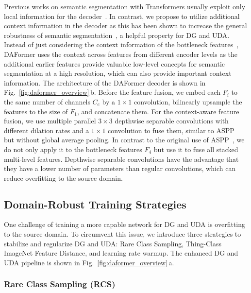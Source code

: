 \documentclass[journal,compsoc]{IEEEtran}
\begin{document}
Previous works on semantic segmentation with Transformers usually exploit only local information for the decoder~\cite{xie2021segformer, zheng2021rethinking}.
In contrast, we propose to utilize additional context information in the decoder
as this has been shown to increase the general robustness of semantic segmentation~\cite{kamann2021benchmarking}, a helpful property for DG and UDA. Instead of just considering the context information of the bottleneck features~\cite{chen2017deeplab, chen2018encoder}, DAFormer uses the context across features from different encoder levels as the additional earlier features provide valuable low-level concepts for semantic segmentation at a high resolution, which can also provide important context information.
The architecture of the DAFormer decoder is shown in Fig.~\ref{fig:daformer_overview}\,b. Before the feature fusion, we embed each $F_i$ to the same number of channels $C_{e}$ by a $1{\times}1$ convolution, bilinearly upsample the features to the size of $F_1$, and concatenate them. For the context-aware feature fusion, we use multiple parallel $3{\times}3$ depthwise separable convolutions with different dilation rates and a $1{\times}1$ convolution to fuse them, similar to ASPP~\cite{chen2018encoder} but without global average pooling. In contrast to the original use of ASPP~\cite{chen2018encoder}, we do not only apply it to the bottleneck features $F_4$ but use it to fuse all stacked multi-level features. Depthwise separable convolutions have the advantage that they have a lower number of parameters than regular convolutions, which can reduce overfitting to the source domain.

\subsection{Domain-Robust Training Strategies}
\label{sec:methods_training_strategies}

One challenge of training a more capable network for DG and UDA is overfitting to the source domain. To circumvent this issue, we introduce three strategies to stabilize and regularize DG and UDA: Rare Class Sampling, Thing-Class ImageNet Feature Distance, and learning rate warmup. The enhanced DG and UDA pipeline is shown in Fig.~\ref{fig:daformer_overview}\,a.

\subsubsection{Rare Class Sampling (RCS)}
\label{sec:methods_rare_class_sampling}
\end{document}
